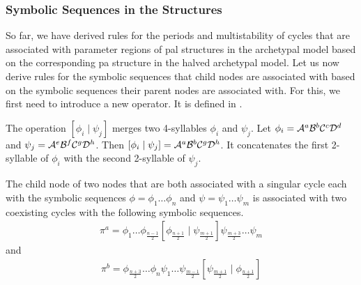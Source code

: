 \subsubsection{Symbolic Sequences in the  Structures}

So far, we have derived rules for the periods and multistability of cycles that are associated with parameter regions of \gls{pal} structures in the archetypal model based on the corresponding \gls{pa} structure in the halved archetypal model.
Let us now derive rules for the symbolic sequences that child nodes are associated with based on the symbolic sequences their parent nodes are associated with.
For this, we first need to introduce a new operator.
It is defined in .

\begin{definition}
	\label{def:merge}
	The operation $\left[\phi_i \mid \psi_j\right]$ merges two 4-syllables $\phi_i$ and $\psi_j$.
	Let $\phi_i = \mathcal{A}^a\mathcal{B}^b\mathcal{C}^c\mathcal{D}^d$ and $\psi_j = \mathcal{A}^e\mathcal{B}^f\mathcal{C}^g\mathcal{D}^h$.
	Then $\left[\phi_i \mid \psi_j\right] = \mathcal{A}^a\mathcal{B}^b\mathcal{C}^g\mathcal{D}^h$.
	It concatenates the first 2-syllable of $\phi_i$ with the second 2-syllable of $\psi_j$.
\end{definition}

\begin{theorem}
	\label{theorem:child.symbolic.1}
	The child node of two nodes that are both associated with a singular cycle each with the symbolic sequences $\phi = \phi_1 \dots \phi_n$ and $\psi = \psi_1 \dots \psi_m$ is associated with two coexisting cycles with the following symbolic sequences.
	\begin{align}
		\pi^a = \phi_1 \dots \phi_{\frac{n-1}{2}} \left[\phi_{\frac{n+1}{2}} \mid \psi_{\frac{m+1}{2}}\right] \psi_{\frac{m+3}{2}} \dots \psi_m
	\end{align}
	and
	\begin{align}
		\pi^b = \phi_{\frac{n+3}{2}} \dots \phi_n \psi_1 \dots \psi_{\frac{m-1}{2}} \left[\psi_{\frac{m+1}{2}} \mid \phi_{\frac{n+1}{2}}\right]
	\end{align}
\end{theorem}

